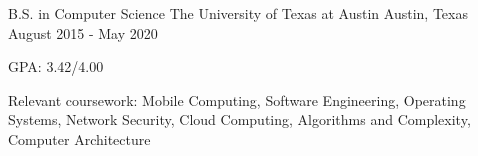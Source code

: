 


\begin{cventries}


\cventry
{B.S. in Computer Science} %
{The University of Texas at Austin} %
{Austin, Texas} %
{August 2015 - May 2020} %
{ %
\begin{cvitems}
\item{GPA: 3.42/4.00}
\item {Relevant coursework:  Mobile Computing, Software Engineering, 
Operating Systems, Network Security, Cloud Computing, 
Algorithms and Complexity, Computer Architecture}
\end{cvitems}
}


\end{cventries}
